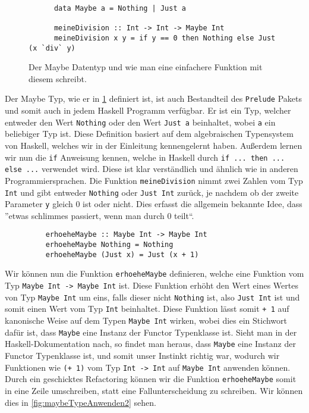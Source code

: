 \documentclass{hhuarticle}
\theoremstyle{definition}
\theoremstyle{theorem}
\begin{document}
  \begin{figure}[h]
    \begin{lstlisting}
      data Maybe a = Nothing | Just a

      meineDivision :: Int -> Int -> Maybe Int
      meineDivision x y = if y == 0 then Nothing else Just (x `div` y)
    \end{lstlisting}
    \caption{Der Maybe Datentyp und wie man eine einfachere Funktion mit diesem schreibt.}%
    \label{fig:maybeType}
  \end{figure}

  Der Maybe Typ, wie er in \cref{fig:maybeType} definiert ist, ist auch
  Bestandteil des \verb|Prelude| Pakets und somit auch in jedem Haskell
  Programm verfügbar. Er ist ein Typ, welcher entweder den Wert \verb|Nothing|
  oder den Wert \verb|Just a| beinhaltet, wobei \verb|a| ein beliebiger Typ ist.
  Diese Definition basiert auf dem algebraischen Typensystem von Haskell,
  welches wir in der Einleitung kennengelernt haben.
  Außerdem lernen wir nun die \verb|if| Anweisung kennen, welche
  in Haskell durch \verb|if ... then ... else ...| verwendet wird.
  Diese ist klar verständlich und ähnlich wie in anderen Programmiersprachen.
  Die Funktion \verb|meineDivision| nimmt zwei Zahlen vom Typ \verb|Int| und
  gibt entweder \verb|Nothing| oder \verb|Just Int| zurück,
  je nachdem ob der zweite Parameter \verb|y| gleich $0$ ist oder nicht.
  Dies erfasst die allgemein bekannte Idee, dass ''etwas schlimmes passiert,
  wenn man durch $0$ teilt``.

  \begin{figure}[h]
    \begin{lstlisting}
    erhoeheMaybe :: Maybe Int -> Maybe Int
    erhoeheMaybe Nothing = Nothing
    erhoeheMaybe (Just x) = Just (x + 1)
    \end{lstlisting}
    \caption{}%
    \label{fig:maybeTypeAnwenden1}
  \end{figure}

  Wir können nun die Funktion \verb|erhoeheMaybe| definieren, welche
  eine Funktion vom Typ \verb|Maybe Int -> Maybe Int| ist. Diese
  Funktion erhöht den Wert eines Wertes von Typ \verb|Maybe Int| um eins, falls
  dieser nicht \verb|Nothing| ist, also \verb|Just Int| ist und somit
  einen Wert vom Typ \verb|Int| beinhaltet.
  Diese Funktion lässt somit \verb|+ 1| auf kanonische Weise
  auf dem Typen \verb|Maybe Int| wirken, wobei dies ein Stichwort
  dafür ist, dass \verb|Maybe| eine Instanz der Functor
  Typenklasse ist. Sieht man in der Haskell-Dokumentation nach, so findet
  man heraus, dass \verb|Maybe| eine Instanz der Functor Typenklasse ist,
  und somit unser Instinkt richtig war, wodurch wir Funktionen wie \verb|(+ 1)|
  vom Typ \verb|Int -> Int| auf \verb|Maybe Int| anwenden können.
  Durch ein geschicktes Refactoring können wir die Funktion
  \verb|erhoeheMaybe| somit in eine Zeile umschreiben, statt eine
  Fallunterscheidung zu schreiben. Wir können dies in \cref{fig:maybeTypeAnwenden2}
  sehen.
\end{document}
